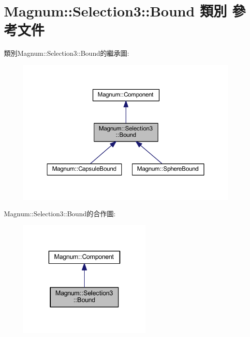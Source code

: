 \hypertarget{class_magnum_1_1_selection3_1_1_bound}{}\section{Magnum\+:\+:Selection3\+:\+:Bound 類別 參考文件}
\label{class_magnum_1_1_selection3_1_1_bound}


類別\+Magnum\+:\+:Selection3\+:\+:Bound的繼承圖\+:\nopagebreak
\begin{figure}[H]
\begin{center}
\leavevmode
\includegraphics[width=340pt]{class_magnum_1_1_selection3_1_1_bound__inherit__graph}
\end{center}
\end{figure}


Magnum\+:\+:Selection3\+:\+:Bound的合作圖\+:\nopagebreak
\begin{figure}[H]
\begin{center}
\leavevmode
\includegraphics[width=190pt]{class_magnum_1_1_selection3_1_1_bound__coll__graph}
\end{center}
\end{figure}
